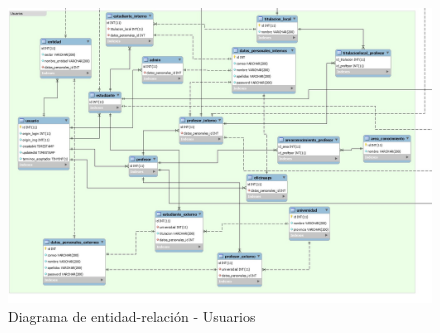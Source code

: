 \documentclass[11pt]{book}
\begin{document}
\begin{landscape}
	\begin{figure}[p]
		\centering
		\includegraphics[scale=0.6]{usuarios}
		\caption{Diagrama de entidad-relación - Usuarios}
		\label{fig:usuarios}
	\end{figure}
\end{landscape}
\end{document}

